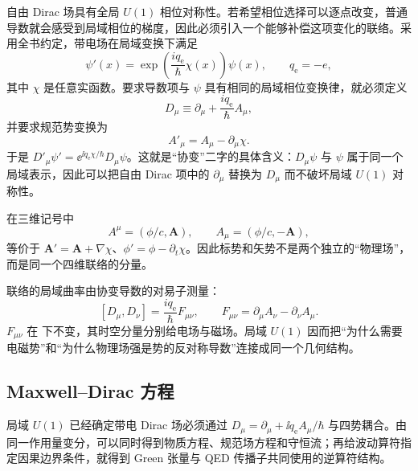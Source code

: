 自由 Dirac 场具有全局 $U(1)$ 相位对称性。若希望相位选择可以逐点改变，普通导数就会感受到局域相位的梯度，因此必须引入一个能够补偿这项变化的联络。采用全书约定，带电场在局域变换下满足
\begin{equation*}
\psi'(x)=\exp\!\left(\frac{i q_{\mathrm e}}{\hbar}\chi(x)\right)\psi(x),
\qquad q_{\mathrm e}=-e,
\end{equation*}
其中 $\chi$ 是任意实函数。要求导数项与 $\psi$ 具有相同的局域相位变换律，就必须定义
\begin{equation}
\boxed{D_\mu\equiv\partial_\mu+\frac{i q_{\mathrm e}}{\hbar}A_\mu,}
\label{eq:covariant-derivative}
\end{equation}
并要求规范势变换为
\begin{equation}
A'_\mu=A_\mu-\partial_\mu\chi.
\label{eq:gauge-A-lower}
\end{equation}
于是 $D'_\mu\psi'=\ee^{\ii q_{\mathrm e}\chi/\hbar}D_\mu\psi$。这就是“协变”二字的具体含义：$D_\mu\psi$ 与 $\psi$ 属于同一个局域表示，因此可以把自由 Dirac 项中的 $\partial_\mu$ 替换为 $D_\mu$ 而不破坏局域 $U(1)$ 对称性。

在三维记号中
\begin{equation*}
A^\mu=(\phi/c,\mathbf A),
\qquad
A_\mu=(\phi/c,-\mathbf A),
\end{equation*}
 等价于 $\mathbf A' =\mathbf A+\nabla\chi$、$\phi'=\phi-\partial_t\chi$。因此标势和矢势不是两个独立的“物理场”，而是同一个四维联络的分量。

联络的局域曲率由协变导数的对易子测量：
\begin{equation}
\boxed{
[D_\mu,D_\nu]=\frac{i q_{\mathrm e}}{\hbar}F_{\mu\nu},
\qquad
F_{\mu\nu}=\partial_\mu A_\nu-\partial_\nu A_\mu.}
\label{eq:covariant-commutator}
\end{equation}
$F_{\mu\nu}$ 在 下不变，其时空分量分别给电场与磁场。局域 $U(1)$ 因而把“为什么需要电磁势”和“为什么物理场强是势的反对称导数”连接成同一个几何结构。

\subsection{Maxwell--Dirac 方程}

局域 $U(1)$ 已经确定带电 Dirac 场必须通过 $D_\mu=\partial_\mu+\ii q_{\mathrm e} A_\mu/\hbar$ 与四势耦合。由同一作用量变分，可以同时得到物质方程、规范场方程和守恒流；再给波动算符指定因果边界条件，就得到 Green 张量与 QED 传播子共同使用的逆算符结构。

